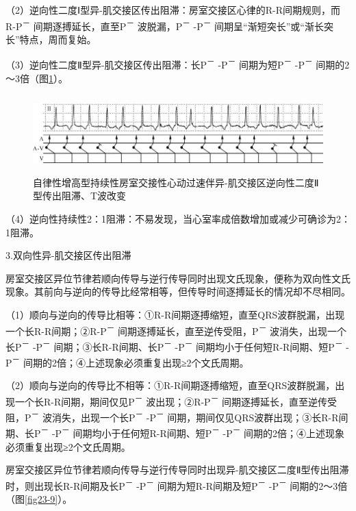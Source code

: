（2）逆向性二度Ⅰ型异-肌交接区传出阻滞：房室交接区心律的R-R间期规则，而R-P\textsuperscript{－}
间期逐搏延长，直至P\textsuperscript{－} 波脱漏，P\textsuperscript{－}
-P\textsuperscript{－} 间期呈“渐短突长”或“渐长突长”特点，周而复始。

（3）逆向性二度Ⅱ型异-肌交接区传出阻滞：长P\textsuperscript{－}
-P\textsuperscript{－} 间期为短P\textsuperscript{－}
-P\textsuperscript{－} 间期的2～3倍（图\ref{fig23-8}）。

\begin{figure}[!htbp]
 \centering
 \includegraphics[width=5.78125in,height=1.1875in]{./images/Image00392.jpg}
 \captionsetup{justification=centering}
 \caption{自律性增高型持续性房室交接性心动过速伴异-肌交接区逆向性二度Ⅱ型传出阻滞、T波改变}
 \label{fig23-8}
  \end{figure} 

（4）逆向性持续性2：1阻滞：不易发现，当心室率成倍数增加或减少可确诊为2：1阻滞。

3.双向性异-肌交接区传出阻滞

房室交接区异位节律若顺向传导与逆行传导同时出现文氏现象，便称为双向性文氏现象。其前向与逆向的传导比经常相等，但传导时间逐搏延长的情况却不尽相同。

（1）顺向与逆向的传导比相等：①R-R间期逐搏缩短，直至QRS波群脱漏，出现一个长R-R间期；②R-P\textsuperscript{－}
间期逐搏延长，直至逆传受阻，P\textsuperscript{－}
波消失，出现一个长P\textsuperscript{－} -P\textsuperscript{－}
间期；③长R-R间期、长P\textsuperscript{－} -P\textsuperscript{－}
间期均小于任何短R-R间期、短P\textsuperscript{－} -P\textsuperscript{－}
间期的2倍；④上述现象必须重复出现≥2个文氏周期。

（2）顺向与逆向的传导比不相等：①R-R间期逐搏缩短，直至QRS波群脱漏，出现一个长R-R间期，期间仅见P\textsuperscript{－}
波出现；②R-P\textsuperscript{－}
间期逐搏延长，直至逆传受阻，P\textsuperscript{－}
波消失，出现一个长P\textsuperscript{－} -P\textsuperscript{－}
间期，期间仅见QRS波群出现；③长R-R间期、长P\textsuperscript{－}
-P\textsuperscript{－} 间期均小于任何短R-R间期、短P\textsuperscript{－}
-P\textsuperscript{－} 间期的2倍；④上述现象必须重复出现≥2个文氏周期。

房室交接区异位节律若顺向传导与逆行传导同时出现异-肌交接区二度Ⅱ型传出阻滞时，则出现长R-R间期及长P\textsuperscript{－}
-P\textsuperscript{－} 间期为短R-R间期及短P\textsuperscript{－}
-P\textsuperscript{－} 间期的2～3倍（图\ref{fig23-9}）。

